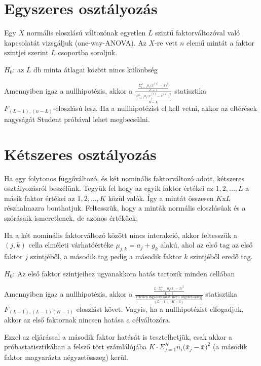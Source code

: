 \pagebreak

\section{Egyszeres osztályozás}

Egy $X$ normális eloszlású változónak egyetlen $L$ szintű faktorváltozóval való kapcsolatát vizsgáljuk (one-way-ANOVA). Az $X$-re vett $n$ elemű mintát a faktor szintjei szerint $L$ csoportba soroljuk.

$H_0$: az $L$ db minta átlagai között nincs különbség

Amennyiben igaz a nullhipotézis, akkor a $\frac{\frac{\Sigma^L_{i=1}n_i \big(\bar{x}^{(i)} - \bar{x} \big)^2}{L-1}}{\frac{\Sigma^L_{i=1}n_i \big (x^{(i)}_j - \bar{x}^{(i)} \big)^2}{n-L}}$ statisztika\\ $F_{(L-1),(n-L)}$-eloszlású lesz. Ha a nullhipotézist el kell vetni, akkor az eltérések nagyságát Student próbával lehet megbecsülni.

\section{Kétszeres osztályozás}

Ha egy folytonos függőváltozó, és két nominális faktorváltozó adott, kétszeres osztályozásról beszélünk. Tegyük fel hogy az egyik faktor értékei az $1, 2, ..., L$ a másik faktor értékei az $1, 2, ..., K$ közül valók. Így a mintát összesen $K$x$L$ részhalmazra bonthatjuk. Feltesszük, hogy a minták normális eloszlásúak és a szórásaik ismeretlenek, de azonos értékűek.

Ha a két nominális faktorváltozó között nincs interakció, akkor feltesszük a $(j,k)$ cella elméleti várhatóértéke $\mu_{j,k} = a_j+g_k$ alakú, ahol az első tag az első faktor $j$ szintjéből, a második tag pedig a második faktor $k$ szintjéből eredő tag.

$H_0$: Az első faktor szintjeihez ugyanakkora hatás tartozik minden cellában

Amennyiben igaz a nullhipotézis, akkor a
$\frac{\frac{L \cdot \Sigma^L_{i=1}n_i \big(\bar{x}_i - \bar{x} \big)^2}{L-1}}{\frac{\text{véletlen ingadozásokat mérő négyzetösszeg}}{(L-1)(K-1)}}$
statisztika\\ $F_{(L-1),(L-1)(K-1)}$ eloszlást követ. Vagyis, ha a nullhipotézist elfogadjuk, akkor az első faktornak nincsen hatása a célváltozóra.

Ezzel az eljárással a második faktor hatását is tesztelhetjük, csak akkor a próbastatisztikában a felsző tört számlálójába $K \cdot \Sigma^K_{j=1}n_i \big(\bar{x}_j - \bar{x} \big)^2$ (a második faktor magyarázta négyzetösszeg) kerül.

